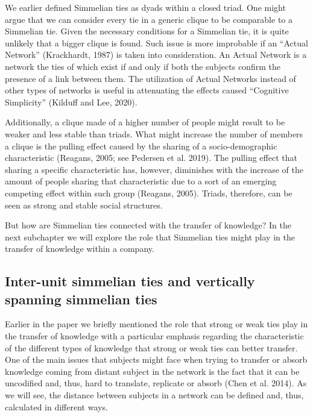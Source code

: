 \documentclass{article}
\begin{document}
We earlier defined Simmelian ties as dyads within a closed triad. One might argue that we can consider every tie in a generic clique to be comparable to a Simmelian tie. Given the necessary conditions for a Simmelian tie, it is quite unlikely that a bigger clique is found. Such issue is more improbable if an “Actual Network”  (Krackhardt, 1987) is taken into consideration. An Actual Network is a network the ties of which exist if and only if both the subjects confirm the presence of a link between them.  The utilization of Actual Networks instead of other types of networks is useful in attenuating the effects caused “Cognitive Simplicity” (Kilduff and Lee, 2020). 

Additionally, a clique made of a higher number of people might result to be weaker and less stable than triads. What might increase the number of members a clique is the pulling effect caused by the sharing of a socio-demographic characteristic (Reagans, 2005; see Pedersen et al. 2019). The pulling effect that sharing a specific characteristic has, however, diminishes with the increase of the amount of people sharing that characteristic due to a sort of an emerging competing effect within such group (Reagans, 2005). Triads, therefore, can be seen as strong and stable social structures. 

But how are Simmelian ties connected with the transfer of knowledge? In the next subchapter we will explore the role that Simmelian ties might play in the transfer of knowledge within a company.

\subsection{Inter-unit simmelian ties and vertically spanning simmelian ties}
Earlier in the paper we briefly mentioned the role that strong or weak ties play in the transfer of knowledge with a particular emphasis regarding the characteristic of the different types of knowledge that strong or weak ties can better transfer. One of the main issues that subjects might face when trying to transfer or absorb knowledge coming from distant subject in the network is the fact that it can be uncodified and, thus, hard to translate, replicate or absorb (Chen et al. 2014). As we will see, the distance between subjects in a network can be defined and, thus, calculated in different ways.
\end{document}
